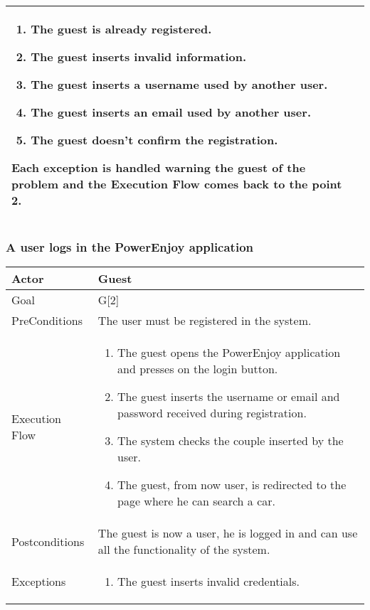 \documentclass{article}
\begin{document}
\begin{tabularx}{\textwidth}{  l  X  }
\begin{enumerate}
			 \item{The guest is already registered.}
					 			 \item{The guest inserts invalid information.}
					 		   \item{The guest inserts a username used by another user.}
					 		   \item{The guest inserts an email used by another user.}
					 		 	 \item{The guest doesn't confirm the registration.}
					 		 \end{enumerate}
					 Each exception is handled warning the guest of the problem and the Execution Flow comes back to the point 2.\\
		\hline
	\end{tabularx}

	\subsubsection{A user logs in the PowerEnjoy application}
	\begin{tabularx}{\textwidth}{  l  X  }
		\hline
		Actor & Guest\\
		\hline
		Goal & G[2]\\
		\hline
		PreConditions & The user must be registered in the system.\\
		\hline
		Execution Flow & \begin{enumerate}
			\item{The guest opens the PowerEnjoy application and presses on the login button.}
										 \item{The guest inserts the username or email and password received during registration.}
										 \item{The system checks the couple inserted by the user.}
										 \item{The guest, from now user, is redirected to the page where he can search a car.}
										\end{enumerate}\\
		\hline
		Postconditions & The guest is now a user, he is logged in and can use all the functionality of the system.\\
		\hline
		Exceptions & \begin{enumerate} 
			\item{The guest inserts invalid credentials.}
			\end{enumerate}\\
		\hline
	\end{tabularx}
\end{document}
